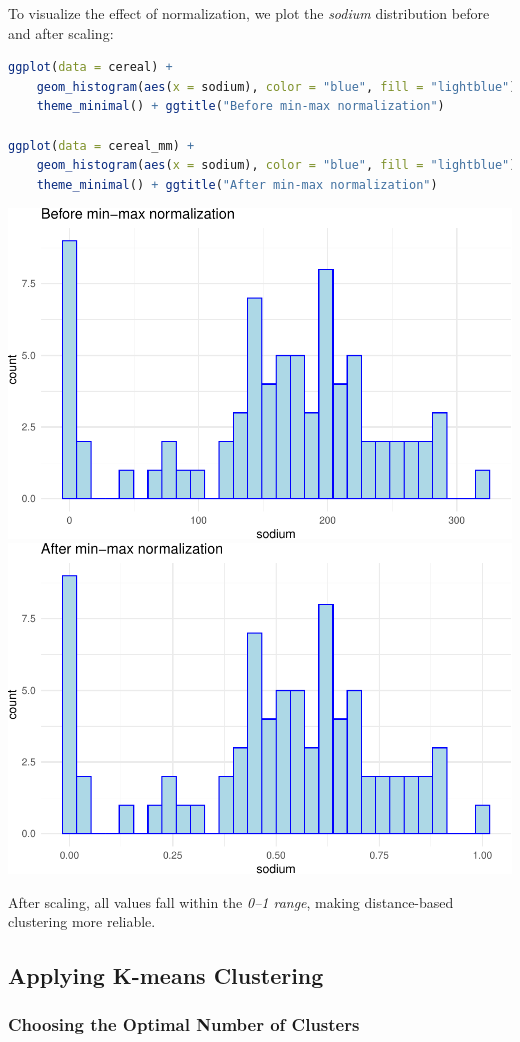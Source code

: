 \documentclass[
]{book}
\theoremstyle{definition}
\theoremstyle{definition}
\theoremstyle{definition}
\theoremstyle{definition}
\theoremstyle{remark}
\begin{document}
To visualize the effect of normalization, we plot the \emph{sodium} distribution before and after scaling:

\begin{lstlisting}[language=R]
ggplot(data = cereal) +
    geom_histogram(aes(x = sodium), color = "blue", fill = "lightblue") +
    theme_minimal() + ggtitle("Before min-max normalization")

ggplot(data = cereal_mm) +
    geom_histogram(aes(x = sodium), color = "blue", fill = "lightblue") + 
    theme_minimal() + ggtitle("After min-max normalization")
\end{lstlisting}

\includegraphics[width=0.5\linewidth]{clustering_files/figure-latex/unnamed-chunk-10-1} \includegraphics[width=0.5\linewidth]{clustering_files/figure-latex/unnamed-chunk-10-2}

After scaling, all values fall within the \emph{0--1 range}, making distance-based clustering more reliable.

\subsection{Applying K-means Clustering}\label{applying-k-means-clustering}

\subsubsection*{Choosing the Optimal Number of Clusters}\label{choosing-the-optimal-number-of-clusters}
\end{document}
